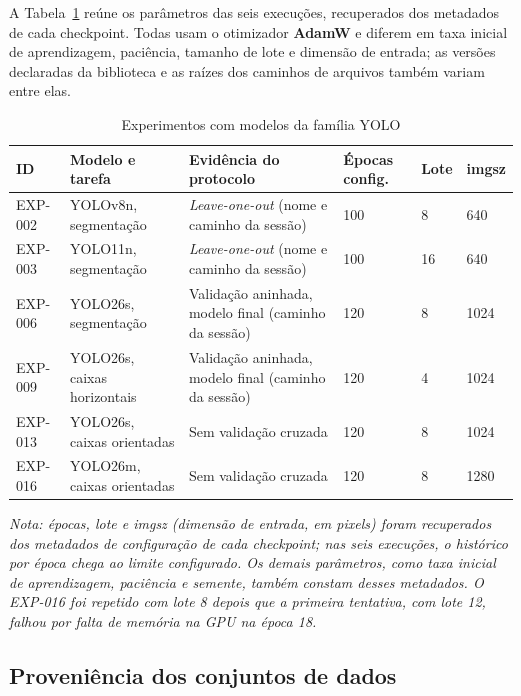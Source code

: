 A Tabela~\ref{tab:experimentos-yolo} re\'une os par\^ametros das seis execu\c{c}\~oes, recuperados dos metadados de cada checkpoint. Todas usam o otimizador \textbf{AdamW} \citep{loshchilov2019} e diferem em taxa inicial de aprendizagem, paci\^encia, tamanho de lote e dimens\~ao de entrada; as vers\~oes declaradas da biblioteca e as ra\'izes dos caminhos de arquivos tamb\'em variam entre elas.

\begin{table}[htb]
\centering
\caption{Experimentos com modelos da fam\'ilia YOLO}
\label{tab:experimentos-yolo}
\small
\begin{tabular}{p{1.7cm}p{3.4cm}p{4.2cm}p{1.7cm}p{1cm}p{1.2cm}}
\hline
\textbf{ID} & \textbf{Modelo e tarefa} & \textbf{Evid\^encia do protocolo} & \textbf{\'Epocas config.} & \textbf{Lote} & \textbf{imgsz} \\
\hline
EXP-002 & YOLOv8n, segmenta\c{c}\~ao & \textit{Leave-one-out} (nome e caminho da sess\~ao) & 100 & 8 & 640 \\
EXP-003 & YOLO11n, segmenta\c{c}\~ao & \textit{Leave-one-out} (nome e caminho da sess\~ao) & 100 & 16 & 640 \\
EXP-006 & YOLO26s, segmenta\c{c}\~ao & Valida\c{c}\~ao aninhada, modelo final (caminho da sess\~ao) & 120 & 8 & 1024 \\
EXP-009 & YOLO26s, caixas horizontais & Valida\c{c}\~ao aninhada, modelo final (caminho da sess\~ao) & 120 & 4 & 1024 \\
EXP-013 & YOLO26s, caixas orientadas & Sem valida\c{c}\~ao cruzada & 120 & 8 & 1024 \\
EXP-016 & YOLO26m, caixas orientadas & Sem valida\c{c}\~ao cruzada & 120 & 8 & 1280 \\
\hline
\end{tabular}

\vspace{0.3cm}
\footnotesize \textit{Nota: \'epocas, lote e imgsz (dimens\~ao de entrada, em pixels) foram recuperados dos metadados de configura\c{c}\~ao de cada checkpoint; nas seis execu\c{c}\~oes, o hist\'orico por \'epoca chega ao limite configurado. Os demais par\^ametros, como taxa inicial de aprendizagem, paci\^encia e semente, tamb\'em constam desses metadados. O EXP-016 foi repetido com lote 8 depois que a primeira tentativa, com lote 12, falhou por falta de mem\'oria na GPU na \'epoca 18.}
\end{table}

\subsection{Proveni\^encia dos conjuntos de dados}
\label{sec:proveniencia-conjuntos}

